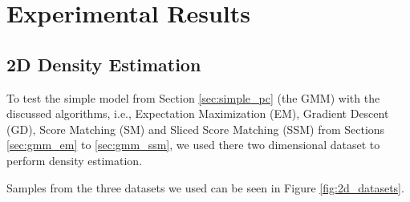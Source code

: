 \renewcommand{\vec}[1]{\textbf{#1}}

\chapter{Experimental Results}
\label{cha:experimental_results}

\section{2D Density Estimation}

To test the simple model from Section \ref{sec:simple_pc} (the GMM) with the discussed algorithms, i.e., Expectation Maximization (EM), 
Gradient Descent (GD), Score Matching (SM) and Sliced Score Matching (SSM) from Sections \ref{sec:gmm_em} to \ref{sec:gmm_ssm}, we used there
two dimensional dataset to perform density estimation. 

Samples from the three datasets we used can be seen in Figure \ref{fig:2d_datasets}. \\

